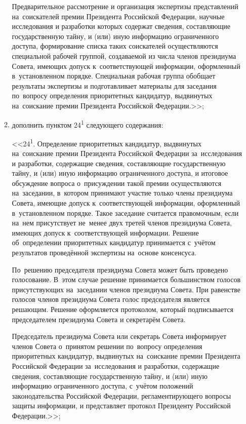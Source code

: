 \documentclass[14pt, a4paper]{extarticle}
\begin{document}
\begin{enumerate}
\begin{enumerate}[label=\asbuk*), ref=\asbuk*]
		Предварительное рассмотрение и организация экспертизы представлений на~соискателей премии Президента Российской Федерации, научные исследования и разработки которых содержат сведения, составляющие государственную тайну, и (или) иную информацию ограниченного доступа, формирование списка таких соискателей осуществляются специальной рабочей группой, создаваемой из числа членов президиума Совета, имеющих допуск к~соответствующей информации, оформленный в~установленном порядке. Специальная рабочая группа обобщает результаты экспертизы и подготавливает материалы для заседания по~вопросу определения приоритетных кандидатур, выдвинутых на~соискание премии Президента Российской Федерации.>>;
		
		\item дополнить пунктом 24\textsuperscript{1} следующего содержания:
		
		<<24\textsuperscript{1}. Определение приоритетных кандидатур, выдвинутых на~соискание премии Президента Российской Федерации за~исследования и разработки, содержащие сведения, составляющие государственную тайну, и (или) иную информацию ограниченного доступа, и итоговое обсуждение вопроса о~присуждении такой премии осуществляются на~заседании, в~котором принимают участие только члены президиума Совета, имеющие допуск к~соответствующей информации, оформленный в~установленном порядке. Такое заседание считается правомочным, если на~нем присутствует не~менее двух третей членов президиума Совета, имеющих допуск к~соответствующей информации. Решение об~определении приоритетных кандидатур принимается с~учётом результатов проведённой экспертизы на~основе консенсуса.
		
		По~решению председателя президиума Совета может быть проведено голосование. В~этом случае решение принимается большинством голосов присутствующих на~заседании членов президиума Совета. При равенстве голосов членов президиума Совета голос председателя является решающим. Решение оформляется протоколом, который подписывается председателем президиума Совета и секретарём Совета.
		
		Председатель президиума Совета или секретарь Совета информирует членов Совета о~принятом решении по~вопросу определения приоритетных кандидатур, выдвинутых на~соискание премии Президента Российской Федерации за~исследования и разработки, содержащие сведения, составляющие государственную тайну, и (или) иную информацию ограниченного доступа, с~учётом положений законодательства Российской Федерации, регламентирующего вопросы защиты информации, и представляет протокол Президенту Российской Федерации.>>;
		

\end{enumerate}
\end{enumerate}
\end{document}
